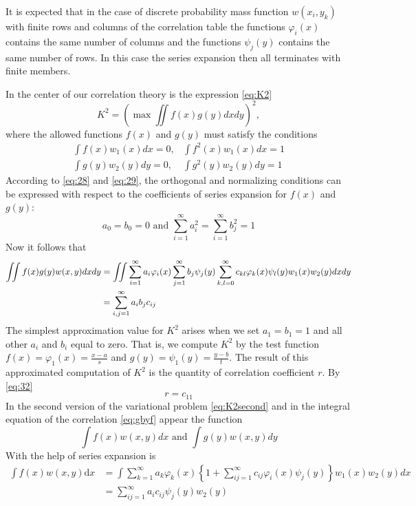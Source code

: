 \documentclass{article}
\begin{document}
It is expected that in the case of discrete probability mass
function $w(x_i, y_k)$ with finite rows and columns of the correlation
table the functions $\varphi_i(x)$ contains the same number of
columns and the functions $\psi_j(y)$ contains the same
number of rows. In this case the series expansion then all terminates with finite members.

In the center of our correlation theory is the expression \eqref{eq:K2}
\begin{equation*}
    K^2 = (\max \iint f(x)g(y)dxdy)^2,
\end{equation*}
where the allowed functions $f(x)$
and $g(y)$ must satisfy the conditions
$$
\begin{array}{ll}
\int f(x) w_{1}(x) d x=0, & \int f^{2}(x) w_{1}(x) d x=1 \\
\int g(y) w_{2}(y) d y=0, & \int g^{2}(y) w_{2}(y) d y=1
\end{array}
$$
According to \eqref{eq:28}
and \eqref{eq:29}, the orthogonal and normalizing conditions
can be expressed with respect to the coefficients of series
expansion for $f(x)$ and $g(y)$:
\begin{equation}\label{eq:31}
    a_0 = b_0 = 0 \textrm{ and } 
    \sum_{i=1}^{\infty} a_i^2
    =\sum_{i=1}^{\infty} b_j^2 = 1
\end{equation}
Now it follows that
\begin{align}\label{eq:32}
\iint f(x) g(y) w(x, y) d x d y 
&=\iint \sum_{i=1}^{\infty} a_{i} \varphi_{i}(x) \sum_{j=1}^{\infty} b_{j} \psi_{j}(y) \sum_{k, l=0}^{\infty} c_{k l} \varphi_{k}(x) \psi_{l}(y) w_{1}(x) w_{2}(y) d x d y \notag\\
&=\sum_{i, j=1}^{\infty} a_{i} b_{j} c_{i j}
\end{align}
The simplest approximation value for $K^2$ arises when
we set $a_1=b_1=1$ and all other $a_i$
and $b_i$ equal to zero. That is, we compute $K^2$ by
the test function $f(x) = \varphi_1(x) = \frac{x-a}{s}$
and $g(y) = \psi_1(y) = \frac{y-b}{t}$. The result of this
approximated computation of $K^2$ is the quantity of
correlation coefficient $r$. By \eqref{eq:32}
\begin{equation}
    r = c_{11}
\end{equation}
In the second version of the variational problem
\eqref{eq:K2second} and in the integral equation of the
correlation \eqref{eq:gbyf} appear the function
$$
\int f(x) w(x,y)dx \textrm{ and }
\int g(y) w(x,y)dy
$$
With the help of series expansion is
$$
\begin{aligned}
\int f(x) w(x, y) \mathrm{d} x &=\int \sum_{k=1}^{\infty} a_{k} \varphi_{k}(x)\left\{1+\sum_{i j=1}^{\infty} c_{i j} \varphi_{i}(x) \psi_{j}(y)\right\} w_{1}(x) w_{2}(y) d x \\
&=\sum_{i j=1}^{\infty} a_{i} c_{i j} \psi_{j}(y) w_{2}(y)
\end{aligned}
$$
\end{document}
